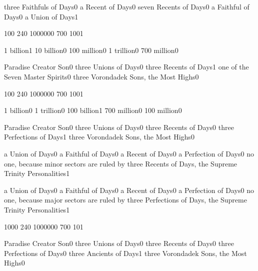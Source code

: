 {three Faithfuls of Days}{0}
{a Recent of Days}{0}
{seven Recents of Days}{0}
{a Faithful of Days}{0}
{a Union of Days}{1}
\qstop

{10}{0}
{24}{0}
{100000}{0}
{70}{0}
{100}{1}
\qstop

{1 billion}{1}
{10 billion}{0}
{100 million}{0}
{1 trillion}{0}
{700 million}{0}
\qstop

{Paradise Creator Son}{0}
{three Unions of Days}{0}
{three Recents of Days}{1}
{one of the Seven Master Spirits}{0}
{three Vorondadek Sons, the Most Highs}{0}
\qstop

{10}{0}
{24}{0}
{100000}{0}
{70}{0}
{100}{1}
\qstop

{1 billion}{0}
{1 trillion}{0}
{100 billion}{1}
{700 million}{0}
{100 million}{0}
\qstop

{Paradise Creator Son}{0}
{three Unions of Days}{0}
{three Recents of Days}{0}
{three Perfections of Days}{1}
{three Vorondadek Sons, the Most Highs}{0}
\qstop

{a Union of Days}{0}
{a Faithful of Days}{0}
{a Recent of Days}{0}
{a Perfection of Days}{0}
{no one, because minor sectors are ruled by three Recents of Days, the Supreme Trinity Personalities}{1}
\qstop

{a Union of Days}{0}
{a Faithful of Days}{0}
{a Recent of Days}{0}
{a Perfection of Days}{0}
{no one, because major sectors are ruled by three Perfections of Days, the Supreme Trinity Personalities}{1}
\qstop

{100}{0}
{24}{0}
{100000}{0}
{70}{0}
{10}{1}
\qstop

{Paradise Creator Son}{0}
{three Unions of Days}{0}
{three Recents of Days}{0}
{three Perfections of Days}{0}
{three Ancients of Days}{1}
{three Vorondadek Sons, the Most Highs}{0}
\qstop

